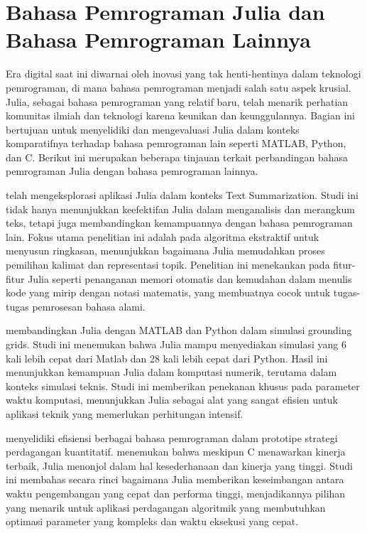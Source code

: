 

\section{Bahasa Pemrograman Julia dan Bahasa Pemrograman Lainnya}

Era digital saat ini diwarnai oleh inovasi yang tak henti-hentinya dalam
teknologi pemrograman, di mana bahasa pemrograman menjadi salah satu aspek
krusial. Julia, sebagai bahasa pemrograman yang relatif baru, telah menarik
perhatian komunitas ilmiah dan teknologi karena keunikan dan keunggulannya.
Bagian ini bertujuan untuk menyelidiki dan mengevaluasi Julia dalam konteks
komparatifnya terhadap bahasa pemrograman lain seperti MATLAB, Python, dan C.
Berikut ini merupakan beberapa tinjauan terkait perbandingan bahasa pemrograman
Julia dengan bahasa pemrograman lainnya.

\cite{thakurTextSummarizerUsing2022} telah mengeksplorasi aplikasi Julia dalam
konteks Text Summarization. Studi ini tidak hanya menunjukkan keefektifan Julia dalam
menganalisis dan merangkum teks, tetapi juga membandingkan kemampuannya dengan
bahasa pemrograman lain. Fokus utama penelitian ini adalah pada algoritma ekstraktif
untuk menyusun ringkasan, menunjukkan bagaimana Julia memudahkan proses
pemilihan kalimat dan representasi topik. Penelitian ini menekankan pada fitur-fitur
Julia seperti penanganan memori otomatis dan kemudahan dalam menulis kode yang mirip
dengan notasi matematis, yang membuatnya cocok untuk tugas-tugas pemrosesan
bahasa alami.

\cite{mouraUsageJuliaProgramming2019} membandingkan Julia dengan MATLAB dan
Python dalam simulasi grounding grids. Studi ini menemukan bahwa Julia mampu menyediakan
simulasi yang 6 kali lebih cepat dari Matlab dan 28 kali lebih cepat dari Python.
Hasil ini menunjukkan kemampuan Julia dalam komputasi numerik, terutama dalam konteks
simulasi teknis. Studi ini memberikan penekanan khusus pada parameter waktu
komputasi, menunjukkan Julia sebagai alat yang sangat efisien untuk aplikasi teknik
yang memerlukan perhitungan intensif.

\cite{cecconMomentumStrategiesComparison2016} menyelidiki efisiensi berbagai bahasa
pemrograman dalam prototipe strategi perdagangan kuantitatif.
\cite{cecconMomentumStrategiesComparison2016} menemukan bahwa meskipun C
menawarkan kinerja terbaik, Julia menonjol dalam hal kesederhanaan dan kinerja yang
tinggi. Studi ini membahas secara rinci bagaimana Julia memberikan keseimbangan
antara waktu pengembangan yang cepat dan performa tinggi, menjadikannya pilihan yang
menarik untuk aplikasi perdagangan algoritmik yang membutuhkan optimasi parameter
yang kompleks dan waktu eksekusi yang cepat.


